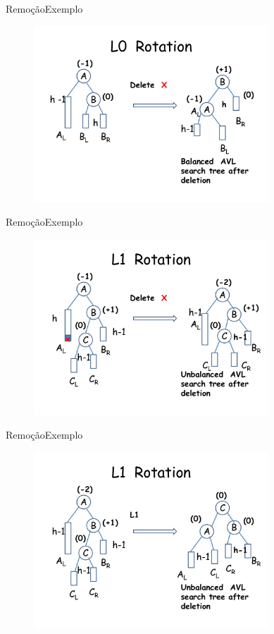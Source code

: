 \documentclass[aspectratio=169]{beamer}
\begin{document}

\begin{frame}{Remoção}{Exemplo}
\begin{figure}[!h]
  \centering
  \includegraphics[width=250pt]{imagens/exemplo_remocao14.png}
  \label{fig_exemplo_remocao14}
\end{figure}
\end{frame}


\begin{frame}{Remoção}{Exemplo}
\begin{figure}[!h]
  \centering
  \includegraphics[width=250pt]{imagens/exemplo_remocao15.png}
  \label{fig_exemplo_remocao15}
\end{figure}
\end{frame}


\begin{frame}{Remoção}{Exemplo}
\begin{figure}[!h]
  \centering
  \includegraphics[width=250pt]{imagens/exemplo_remocao16.png}
  \label{fig_exemplo_remocao16}
\end{figure}
\end{frame}
\end{document}
